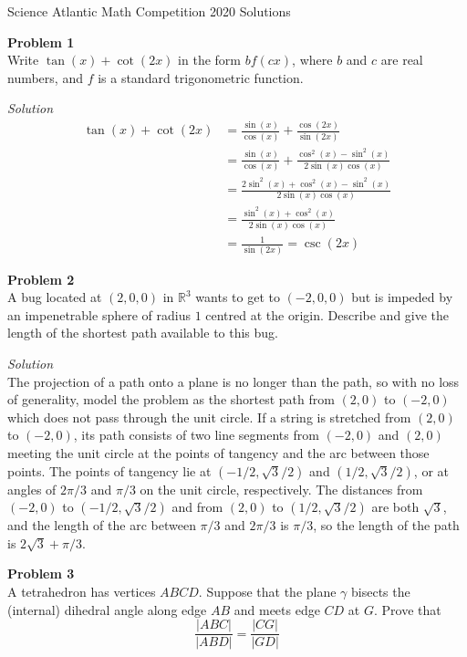 \documentclass{amsart}
\begin{document}
\begin{center}
Science Atlantic Math Competition 2020 Solutions
\end{center}

\textbf{Problem 1}\\
Write $\tan(x) + \cot(2x)$ in the form $bf(cx)$, where $b$ and $c$ are real numbers, and $f$ is a standard trigonometric function.

\textit{Solution}\\
\begin{align*}
\tan(x) + \cot(2x) &= \frac{\sin(x)}{\cos(x)} + \frac{\cos(2x)}{\sin(2x)} \\
&= \frac{\sin(x)}{\cos(x)} + \frac{\cos^2(x) - \sin^2(x)}{2\sin(x)\cos(x)} \\
&= \frac{2 \sin^2(x) + \cos^2(x) - \sin^2(x)}{2\sin(x)\cos(x)} \\
&= \frac{\sin^2(x) + \cos^2(x)}{2\sin(x)\cos(x)} \\
&= \frac{1}{\sin(2x)} = \csc(2x)
\end{align*}

\pagebreak

\textbf{Problem 2}\\
A bug located at $(2, 0, 0)$ in $\mathbb{R}^3$ wants to get to $(-2, 0, 0)$ but is impeded by an impenetrable sphere of radius $1$ centred at the origin.
Describe and give the length of the shortest path available to this bug.

\textit{Solution}\\
The projection of a path onto a plane is no longer than the path, so with no loss of generality, model the problem as the shortest path from $(2, 0)$ to $(-2, 0)$ which does not pass through the unit circle.
If a string is stretched from $(2, 0)$ to $(-2, 0)$, its path consists of two line segments from $(-2, 0)$ and $(2, 0)$ meeting the unit circle at the points of tangency and the arc between those points.
The points of tangency lie at $(-1/2, \sqrt{3}/2)$ and $(1/2, \sqrt{3}/2)$, or at angles of $2\pi/3$ and $\pi/3$ on the unit circle, respectively.
The distances from $(-2, 0)$ to $(-1/2, \sqrt{3}/2)$ and from $(2, 0)$ to $(1/2, \sqrt{3}/2)$ are both $\sqrt{3}$, and the length of the arc between $\pi/3$ and $2\pi/3$ is $\pi/3$, so the length of the path is $2\sqrt{3} + \pi/3$.

\pagebreak

\textbf{Problem 3}\\
A tetrahedron has vertices $ABCD$.
Suppose that the plane $\gamma$ bisects the (internal) dihedral angle along edge $AB$ and meets edge $CD$ at $G$.
Prove that
\[ \frac{\lvert ABC \rvert}{\lvert ABD \rvert} = \frac{\lvert CG \rvert}{\lvert GD \rvert} \]
\end{document}
